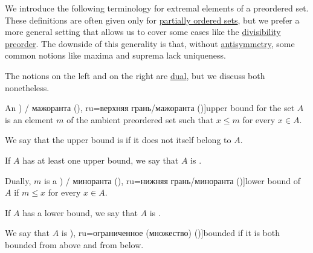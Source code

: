 \begin{definition}\label{def:extremal_points}
  We introduce the following terminology for extremal elements of a preordered set. These definitions are often given only for \hyperref[def:partially_ordered_set]{partially ordered sets}, but we prefer a more general setting that allows us to cover some cases like the \hyperref[thm:semiring_divisibility_order]{divisibility preorder}. The downside of this generality is that, without \hyperref[def:binary_relation/antisymmetric]{antisymmetry}, some common notions like maxima and suprema lack uniqueness.

  The notions on the left and on the right are \hyperref[thm:preorder_duality]{dual}, but we discuss both nonetheless.

  \begin{thmenum}
    \begin{paracol}{2}
      \begin{leftcolumn}
        An \term[bg=горна граница (\cite[18]{Тагамлицки1971ДиференциалноСмятане}) / мажоранта (\cite[10]{Проданов1982ФункционаленАнализЧаст1}), ru=верхняя грань/мажоранта (\cite[def. 3.8]{Гуров2013ТеорияРешёток})]{upper bound} for the set \( A \) is an element \( m \) of the ambient preordered set such that \( x \leq m \) for every \( x \in A \).

        We say that the upper bound is  if it does not itself belong to \( A \).

        If \( A \) has at least one upper bound, we say that \( A \) is .
      \end{leftcolumn}

      \begin{rightcolumn}
        Dually, \( m \) is a \term[bg=долна граница (\cite[18]{Тагамлицки1971ДиференциалноСмятане}) / миноранта (\cite[10]{Проданов1982ФункционаленАнализЧаст1}), ru=нижняя грань/миноранта (\cite[def. 3.8]{Гуров2013ТеорияРешёток})]{lower bound} of \( A \) if \( m \leq x \) for every \( x \in A \).

        If \( A \) has a lower bound, we say that \( A \) is .

        We say that \( A \) is \term[bg=ограничено (множество) (\cite[19]{Тагамлицки1971ДиференциалноСмятане}), ru=ограниченное (множество) (\cite[39]{Зорич2019АнализЧасть1})]{bounded} if it is both bounded from above and from below.
      \end{rightcolumn}
    \end{paracol}


\end{thmenum}
\end{definition}
